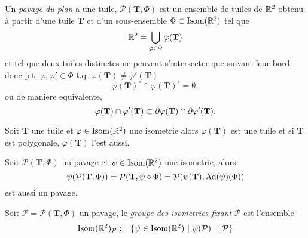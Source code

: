 \begin{definition}
	Un \emph{pavage du plan} a une tuile, $\mathcal{P}(\mathbf{T}, \Phi)$ est un
	ensemble de tuiles de $\mathbb{R}^2$ obtenu à partir d'une tuile $\mathbf{T}$
	et d'un sous-ensemble $\Phi \subset \operatorname{Isom}(\mathbb{R}^2)$ tel que
	\begin{equation*}
		\mathbb{R}^2 = \bigcup_{\varphi \in \Phi} \varphi(\mathbf{T})
	\end{equation*}
	et tel que deux tuiles distinctes ne peuvent s'intersecter que suivant leur
	bord, donc p.t. $\varphi, \varphi' \in \Phi$ 
	t.q. $\varphi(\mathbf{T}) \neq \varphi'(\mathbf{T})$
	\begin{equation*}
		\varphi(\mathbf{T})^\circ \cap \varphi(\mathbf{T})^\circ = \emptyset,
	\end{equation*}
	ou de maniere equivalente,
	\begin{equation*}
		\varphi(\mathbf{T}) \cap \varphi'(\mathbf{T}) \subset
		\partial \varphi(\mathbf{T}) \cap \partial \varphi'(\mathbf{T}).
	\end{equation*}	
\end{definition}

\begin{proposition}
	Soit $\mathbf{T}$ une tuile et $\varphi \in \operatorname{Isom}(\mathbb{R}^2)$ une isometrie alors
	$\varphi(\mathbf{T})$ est une tuile et si $\mathbf{T}$ est polygonale,
	$\varphi(\mathbf{T})$ l'est aussi.
\end{proposition}

\begin{proposition}
	Soit $\mathcal{P}(\mathbf{T}, \Phi)$ un pavage et $\psi \in \operatorname{Isom}(\mathbb{R}^2)$ une
	isometrie, alors 
	\begin{equation*}
		\psi(\mathcal{P}(\mathbf{T}, \Phi)) = \mathcal{P}(\mathbf{T}, \psi \circ \Phi)
		= \mathcal{P}(\psi(\mathbf{T}), \operatorname{Ad}(\psi)(\Phi))
	\end{equation*}
	est aussi un pavage.
\end{proposition}

\begin{definition}
	Soit $\mathcal{P} = \mathcal{P}(\mathbf{T}, \Phi)$ un pavage, le \emph{groupe
	des isometries fixant} $\mathcal{P}$ est l'ensemble
	\begin{equation*}
		\operatorname{Isom}(\mathbb{R}^2)_\mathcal{P} := 
		\{\psi \in \operatorname{Isom}(\mathbb{R}^2)\ |\ \psi(\mathcal{P}) = \mathcal{P}\}
	\end{equation*}
\end{definition}

